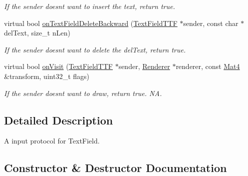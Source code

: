 \begin{DoxyCompactItemize}
\begin{DoxyCompactList}\small\item\em If the sender doesn\textquotesingle{}t want to insert the text, return true. \end{DoxyCompactList}\item 
\mbox{\label{classTextFieldDelegate_a964ac9c160f72010602fe7295ec6d7db}} 
virtual bool \hyperlink{classTextFieldDelegate_a964ac9c160f72010602fe7295ec6d7db}{on\+Text\+Field\+Delete\+Backward} (\hyperlink{classTextFieldTTF}{Text\+Field\+T\+TF} $\ast$sender, const char $\ast$del\+Text, size\+\_\+t n\+Len)
\begin{DoxyCompactList}\small\item\em If the sender doesn\textquotesingle{}t want to delete the del\+Text, return true. \end{DoxyCompactList}\item 
\mbox{\label{classTextFieldDelegate_a75e68d30b57ff894c83a22d463a00bd5}} 
virtual bool \hyperlink{classTextFieldDelegate_a75e68d30b57ff894c83a22d463a00bd5}{on\+Visit} (\hyperlink{classTextFieldTTF}{Text\+Field\+T\+TF} $\ast$sender, \hyperlink{classRenderer}{Renderer} $\ast$renderer, const \hyperlink{classMat4}{Mat4} \&transform, uint32\+\_\+t flags)
\begin{DoxyCompactList}\small\item\em If the sender doesn\textquotesingle{}t want to draw, return true.  NA. \end{DoxyCompactList}\end{DoxyCompactItemize}


\subsection{Detailed Description}
A input protocol for Text\+Field. 

\subsection{Constructor \& Destructor Documentation}
\mbox{\label{classTextFieldDelegate_a006be6969fc9f895b3a7b0bbc2054a99}} 
